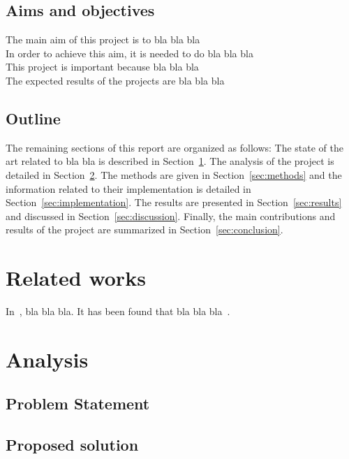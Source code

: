\documentclass[12pt,onecolumn]{article}
\begin{document}
\subsection{Aims and objectives}

The main aim of this project is to bla bla bla\\
In order to achieve this aim, it is needed to do bla bla bla\\
This project is important because bla bla bla\\
The expected results of the projects are bla bla bla\\

\subsection{Outline}
 
The remaining sections of this report are organized as follows: The state of the art related to bla bla is described in Section~\ref{sec:soa}. The analysis of the project is detailed in Section~\ref{sec:analysis}. The methods are given in Section~\ref{sec:methods} and the information related to their implementation is detailed in Section~\ref{sec:implementation}. The results are presented in Section~\ref{sec:results} and discussed in Section~\ref{sec:discussion}. Finally, the main contributions and results of the project are summarized in Section~\ref{sec:conclusion}.

\newpage
\section{Related works}
\label{sec:soa}

In~\cite{knorr2000}, bla bla bla.
It has been found that bla bla bla~\cite{breunig2000}.

\newpage
\section{Analysis}
\label{sec:analysis}

\subsection{Problem Statement}

\subsection{Proposed solution}
\end{document}

